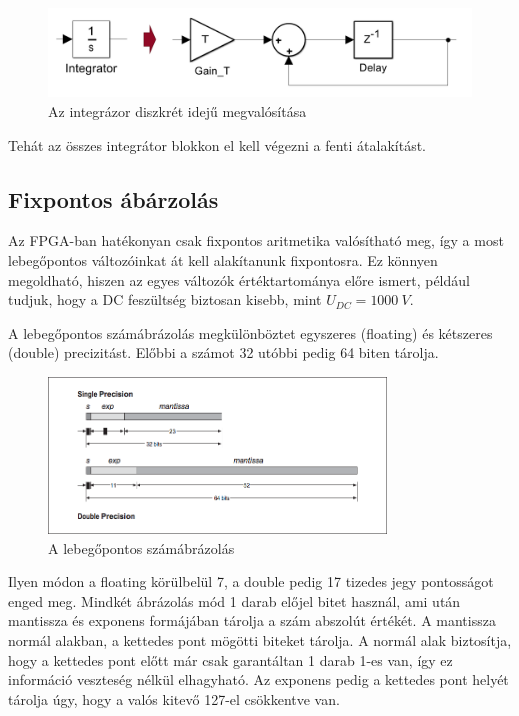 \begin{figure}[h]
	\centering
	\includegraphics[width = \textwidth]{figures/integrator.png}
	\caption{Az integrázor diszkrét idejű megvalósítása} 
	\label{fig:integrator}
\end{figure}

Tehát az összes integrátor blokkon el kell végezni a fenti átalakítást.


\subsection{Fixpontos ábárzolás}

Az FPGA-ban hatékonyan csak fixpontos aritmetika valósítható meg, így a most lebegőpontos változóinkat át kell alakítanunk fixpontosra. Ez könnyen megoldható, hiszen az egyes változók értéktartománya előre ismert, például tudjuk, hogy a DC feszültség biztosan kisebb, mint $U_{DC}=1000\ V$.

A lebegőpontos számábrázolás megkülönböztet egyszeres (floating) és kétszeres (double) precizitást. Előbbi a számot 32 utóbbi pedig 64 biten tárolja.

\begin{figure}[H]
	\centering
	\includegraphics[width = 0.8\textwidth]{figures/floating.png}
	\caption{A lebegőpontos számábrázolás} 
	\label{fig:floating}
\end{figure}

Ilyen módon a floating körülbelül 7, a double pedig 17 tizedes jegy pontosságot enged meg. Mindkét ábrázolás mód 1 darab előjel bitet használ, ami után mantissza és exponens formájában tárolja a szám abszolút értékét. A mantissza normál alakban, a kettedes pont mögötti biteket tárolja. A normál alak biztosítja, hogy a kettedes pont előtt már csak garantáltan 1 darab 1-es van, így ez információ veszteség nélkül elhagyható. Az exponens pedig a kettedes pont helyét tárolja úgy, hogy a valós kitevő 127-el csökkentve van.

